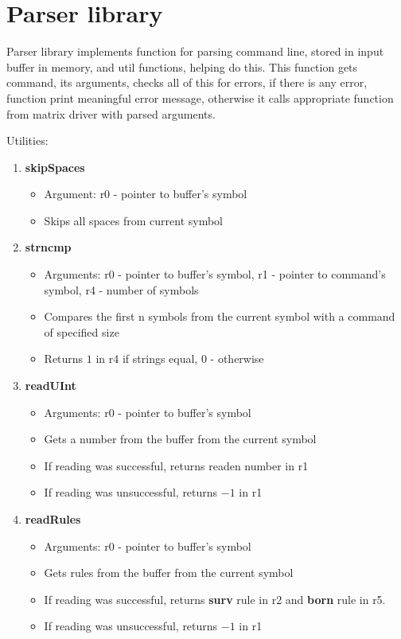 \section*{Parser library}

Parser library implements function for parsing command line, stored in input buffer in memory, and util functions, helping do this. This function gets command, its arguments, checks all of this for errors, if there is any error, function print meaningful error message, otherwise it calls appropriate function from matrix driver with parsed arguments.

Utilities:

\begin{enumerate}
	\item \textbf{skipSpaces}
		\begin{itemize}
			\item Argument: r0 - pointer to buffer's symbol
			\item Skips all spaces from current symbol
		\end{itemize}
	\item \textbf{strncmp}
		\begin{itemize}
			\item Arguments: r0 - pointer to buffer's symbol, r1 - pointer to command's symbol, r4 - number of symbols
			\item Compares the first n symbols from the current symbol with a command of specified size
			\item Returns $1$ in r4 if strings equal, $0$ - otherwise
		\end{itemize}
	\item \textbf{readUInt}
		\begin{itemize}
			\item Arguments: r0 - pointer to buffer's symbol
			\item Gets a number from the buffer from the current symbol
			\item If reading was successful, returns readen number in r1
			\item If reading was unsuccessful, returns $-1$ in r1
		\end{itemize}
	\item \textbf{readRules}
		\begin{itemize}
			\item Arguments: r0 - pointer to buffer's symbol
			\item Gets rules from the buffer from the current symbol
			\item If reading was successful, returns \textbf{surv} rule in r2 and \textbf{born} rule in r5.
			\item If reading was unsuccessful, returns $-1$ in r1
		\end{itemize}
\end{enumerate}

